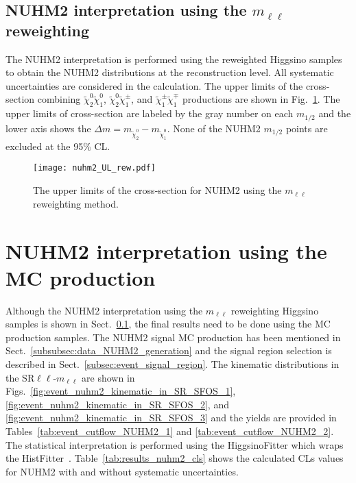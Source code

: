 
\subsection{NUHM2 interpretation using the $m_{\ell \ell}$ reweighting}
\label{subsec:results_mll_reweighting_interpretation}
The NUHM2 interpretation is performed using the reweighted Higgsino samples to obtain the NUHM2 distributions at the reconstruction level.
All systematic uncertainties are considered in the calculation.
The upper limits of the cross-section combining $\widetilde{\chi}^{0}_{2} \widetilde{\chi}^{0}_{1}$, $\widetilde{\chi}^{0}_{2} \widetilde{\chi}^{\pm}_{1}$, and $\widetilde{\chi}^{\pm}_{1} \widetilde{\chi}^{\mp}_{1}$ productions are shown in Fig.~\ref{fig:results_nuhm2_interpretation_reweighting}.
The upper limits of cross-section are labeled by the gray number on each $m_{1/2}$ and the lower axis shows the $\Delta m = m_{\widetilde{\chi}^{0}_{2}} - m_{\widetilde{\chi}^{0}_{1}}$.
None of the NUHM2 $m_{1/2}$ points are excluded at the 95\% CL.

\begin{figure}[htbp]
    \begin{center}
        \texttt{[image: nuhm2\_UL\_rew.pdf]}
        \caption{The upper limits of the cross-section for NUHM2 using the $m_{\ell \ell}$ reweighting method.}
        \label{fig:results_nuhm2_interpretation_reweighting}
    \end{center}
\end{figure}


\section{NUHM2 interpretation using the MC production}
\label{sec:results_mc_production_interpretation}
Although the NUHM2 interpretation using the $m_{\ell \ell}$ reweighting Higgsino samples is shown in Sect.~\ref{subsec:results_mll_reweighting_interpretation}, the final results need to be done using the MC production samples.
The NUHM2 signal MC production has been mentioned in Sect.~\ref{subsubsec:data_NUHM2_generation} and the signal region selection is described in Sect.~\ref{subsec:event_signal_region}.
The kinematic distributions in the SR$\ell \ell$-$m_{\ell \ell}$ are shown in Figs.~\ref{fig:event_nuhm2_kinematic_in_SR_SFOS_1}, \ref{fig:event_nuhm2_kinematic_in_SR_SFOS_2}, and \ref{fig:event_nuhm2_kinematic_in_SR_SFOS_3} and the yields are provided in Tables~\ref{tab:event_cutflow_NUHM2_1} and \ref{tab:event_cutflow_NUHM2_2}.
The statistical interpretation is performed using the HiggsinoFitter which wraps the HistFitter~\cite{Baak:2014wma}.
Table~\ref{tab:results_nuhm2_cls} shows the calculated CLs values for NUHM2 with and without systematic uncertainties.

